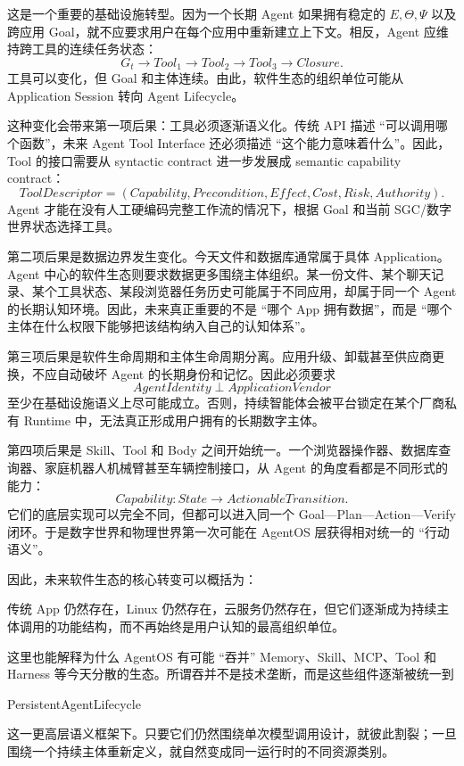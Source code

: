 这是一个重要的基础设施转型。因为一个长期 Agent 如果拥有稳定的 $E,\Theta,\Psi$ 以及跨应用 Goal，就不应要求用户在每个应用中重新建立上下文。相反，Agent 应维持跨工具的连续任务状态：
\[
G_t
\rightarrow
Tool_1
\rightarrow
Tool_2
\rightarrow
Tool_3
\rightarrow
Closure.
\]
工具可以变化，但 Goal 和主体连续。由此，软件生态的组织单位可能从 Application Session 转向 Agent Lifecycle。

这种变化会带来第一项后果：工具必须逐渐语义化。传统 API 描述 ``可以调用哪个函数''，未来 Agent Tool Interface 还必须描述 ``这个能力意味着什么''。因此，Tool 的接口需要从 syntactic contract 进一步发展成 semantic capability contract：
\[
ToolDescriptor
=
(
Capability,
Precondition,
Effect,
Cost,
Risk,
Authority
).
\]
Agent 才能在没有人工硬编码完整工作流的情况下，根据 Goal 和当前 SGC/数字世界状态选择工具。

第二项后果是数据边界发生变化。今天文件和数据库通常属于具体 Application。Agent 中心的软件生态则要求数据更多围绕主体组织。某一份文件、某个聊天记录、某个工具状态、某段浏览器任务历史可能属于不同应用，却属于同一个 Agent 的长期认知环境。因此，未来真正重要的不是 ``哪个 App 拥有数据''，而是 ``哪个主体在什么权限下能够把该结构纳入自己的认知体系''。

第三项后果是软件生命周期和主体生命周期分离。应用升级、卸载甚至供应商更换，不应自动破坏 Agent 的长期身份和记忆。因此必须要求
\[
AgentIdentity
\perp
ApplicationVendor
\]
至少在基础设施语义上尽可能成立。否则，持续智能体会被平台锁定在某个厂商私有 Runtime 中，无法真正形成用户拥有的长期数字主体。

第四项后果是 Skill、Tool 和 Body 之间开始统一。一个浏览器操作器、数据库查询器、家庭机器人机械臂甚至车辆控制接口，从 Agent 的角度看都是不同形式的能力：
\[
Capability:
State
\rightarrow
ActionableTransition.
\]
它们的底层实现可以完全不同，但都可以进入同一个 Goal—Plan—Action—Verify 闭环。于是数字世界和物理世界第一次可能在 AgentOS 层获得相对统一的 ``行动语义''。

因此，未来软件生态的核心转变可以概括为：
\begin{statementbox}
\centering
{}
\end{statementbox}
传统 App 仍然存在，Linux 仍然存在，云服务仍然存在，但它们逐渐成为持续主体调用的功能结构，而不再始终是用户认知的最高组织单位。

这里也能解释为什么 AgentOS 有可能 ``吞并'' Memory、Skill、MCP、Tool 和 Harness 等今天分散的生态。所谓吞并不是技术垄断，而是这些组件逐渐被统一到
\begin{statementbox}
PersistentAgentLifecycle
\end{statementbox}
这一更高层语义框架下。只要它们仍然围绕单次模型调用设计，就彼此割裂；一旦围绕一个持续主体重新定义，就自然变成同一运行时的不同资源类别。

